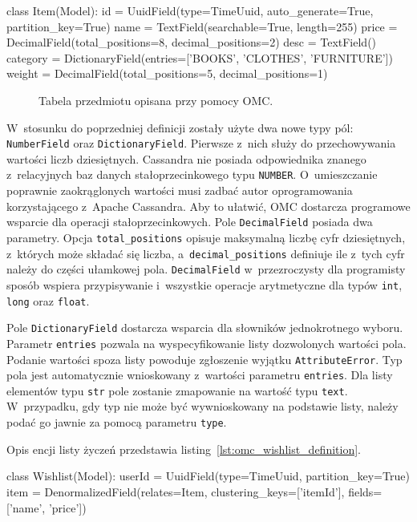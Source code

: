 \begin{verbbox}
class Item(Model):
    id = UuidField(type=TimeUuid, auto_generate=True, partition_key=True)
    name = TextField(searchable=True, length=255)
    price = DecimalField(total_positions=8, decimal_positions=2)
    desc = TextField()
    category = DictionaryField(entries=['BOOKS', 'CLOTHES', 'FURNITURE'])
    weight = DecimalField(total_positions=5, decimal_positions=1)
\end{verbbox}

\begin{figure}[ht!]
	\centering
	\theverbbox
	\caption{Tabela przedmiotu opisana przy pomocy OMC.}
	\label{lst:omc_item_definition}
\end{figure}

W~stosunku do poprzedniej definicji zostały użyte dwa nowe typy pól: \verb+NumberField+ oraz \verb+DictionaryField+. Pierwsze z~nich służy do przechowywania wartości liczb dziesiętnych. Cassandra nie posiada odpowiednika znanego z~relacyjnych baz danych stałoprzecinkowego typu \verb+NUMBER+. O~umieszczanie poprawnie zaokrąglonych wartości musi zadbać autor oprogramowania korzystającego z~Apache Cassandra. Aby to ułatwić, OMC dostarcza programowe wsparcie dla operacji stałoprzecinkowych. Pole \verb+DecimalField+ posiada dwa parametry. Opcja \verb+total_positions+ opisuje maksymalną liczbę cyfr dziesiętnych, z~których może składać się liczba, a~\verb+decimal_positions+ definiuje ile z~tych cyfr należy do części ułamkowej pola. \verb+DecimalField+ w~przezroczysty dla programisty sposób wspiera przypisywanie i~wszystkie operacje arytmetyczne dla typów \verb+int+, \verb+long+ oraz \verb+float+.

Pole \verb+DictionaryField+ dostarcza wsparcia dla słowników jednokrotnego wyboru. Parametr \verb+entries+ pozwala na wyspecyfikowanie listy dozwolonych wartości pola. Podanie wartości spoza listy powoduje zgłoszenie wyjątku \verb+AttributeError+. Typ pola jest automatycznie wnioskowany z~wartości parametru \verb+entries+. Dla listy elementów typu \verb+str+ pole zostanie zmapowanie na wartość typu \verb+text+. W~przypadku, gdy typ nie może być wywnioskowany na podstawie listy, należy podać go jawnie za pomocą parametru \verb+type+.

Opis encji listy życzeń przedstawia listing~\ref{lst:omc_wishlist_definition}.

\begin{verbbox}
class Wishlist(Model):
    userId = UuidField(type=TimeUuid, partition_key=True)
    item = DenormalizedField(relates=Item, 
                             clustering_keys=['itemId'], 
                             fields=['name', 'price'])
\end{verbbox}

